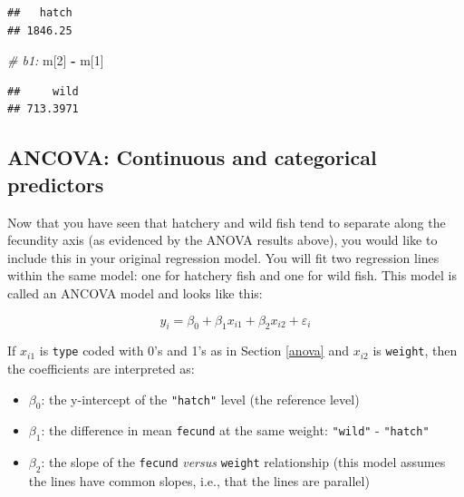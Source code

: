 \documentclass[]{book}
\newenvironment{Shaded}{\begin{snugshade}}{\end{snugshade}}
\newcommand{\KeywordTok}[1]{\textcolor[rgb]{0.13,0.29,0.53}{\textbf{#1}}}
\newcommand{\DataTypeTok}[1]{\textcolor[rgb]{0.13,0.29,0.53}{#1}}
\newcommand{\DecValTok}[1]{\textcolor[rgb]{0.00,0.00,0.81}{#1}}
\newcommand{\StringTok}[1]{\textcolor[rgb]{0.31,0.60,0.02}{#1}}
\newcommand{\CommentTok}[1]{\textcolor[rgb]{0.56,0.35,0.01}{\textit{#1}}}
\newcommand{\OperatorTok}[1]{\textcolor[rgb]{0.81,0.36,0.00}{\textbf{#1}}}
\newcommand{\NormalTok}[1]{#1}
\providecommand{\tightlist}{%
  \setlength{\itemsep}{0pt}\setlength{\parskip}{0pt}}
\theoremstyle{definition}
\theoremstyle{definition}
\theoremstyle{definition}
\theoremstyle{remark}
\begin{document}
\begin{Shaded}
\end{Shaded}

\begin{verbatim}
##   hatch 
## 1846.25
\end{verbatim}

\begin{Shaded}
\begin{Highlighting}[]
\CommentTok{# b1:}
\NormalTok{m[}\DecValTok{2}\NormalTok{] }\OperatorTok{-}\StringTok{ }\NormalTok{m[}\DecValTok{1}\NormalTok{]}
\end{Highlighting}
\end{Shaded}

\begin{verbatim}
##     wild 
## 713.3971
\end{verbatim}

\subsection{ANCOVA: Continuous and categorical
predictors}\label{ancova-continuous-and-categorical-predictors}

Now that you have seen that hatchery and wild fish tend to separate
along the fecundity axis (as evidenced by the ANOVA results above), you
would like to include this in your original regression model. You will
fit two regression lines within the same model: one for hatchery fish
and one for wild fish. This model is called an ANCOVA model and looks
like this:

\begin{equation}
  y_i=\beta_0 + \beta_1 x_{i1} + \beta_2 x_{i2} + \varepsilon_i
\label{eq:ancova}
\end{equation}

If \(x_{i1}\) is \texttt{type} coded with 0's and 1's as in Section
\ref{anova} and \(x_{i2}\) is \texttt{weight}, then the coefficients are
interpreted as:

\begin{itemize}
\tightlist
\item
  \(\beta_0\): the y-intercept of the \texttt{"hatch"} level (the
  reference level)
\item
  \(\beta_1\): the difference in mean \texttt{fecund} at the same
  weight: \texttt{"wild"} - \texttt{"hatch"}
\item
  \(\beta_2\): the slope of the \texttt{fecund} \emph{versus}
  \texttt{weight} relationship (this model assumes the lines have common
  slopes, i.e., that the lines are parallel)
\end{itemize}
\end{document}
